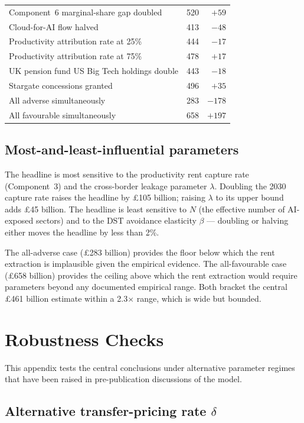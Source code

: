 \documentclass[11pt,letterpaper]{article}
\theoremstyle{remark}
\begin{document}
\begin{table}[ht]
\begin{tabular}{lrr}
Component~6 marginal-share gap doubled & 520 & $+59$ \\
Cloud-for-AI flow halved & 413 & $-48$ \\
Productivity attribution rate at 25\% & 444 & $-17$ \\
Productivity attribution rate at 75\% & 478 & $+17$ \\
UK pension fund US Big Tech holdings double & 443 & $-18$ \\
Stargate concessions granted & 496 & $+35$ \\
\midrule
All adverse simultaneously & 283 & $-178$ \\
All favourable simultaneously & 658 & $+197$ \\
\bottomrule
\end{tabular}
\end{table}

\subsection{Most-and-least-influential parameters}

The headline is most sensitive to the productivity rent capture rate (Component~3) and the cross-border leakage parameter $\lambda$. Doubling the 2030 capture rate raises the headline by \pounds105 billion; raising $\lambda$ to its upper bound adds \pounds45 billion. The headline is least sensitive to $N$ (the effective number of AI-exposed sectors) and to the DST avoidance elasticity $\beta$ --- doubling or halving either moves the headline by less than 2\%.

The all-adverse case (\pounds283 billion) provides the floor below which the rent extraction is implausible given the empirical evidence. The all-favourable case (\pounds658 billion) provides the ceiling above which the rent extraction would require parameters beyond any documented empirical range. Both bracket the central \pounds461 billion estimate within a 2.3$\times$ range, which is wide but bounded.

\section{Robustness Checks}

This appendix tests the central conclusions under alternative parameter regimes that have been raised in pre-publication discussions of the model.

\subsection{Alternative transfer-pricing rate $\delta$}
\end{document}
